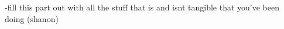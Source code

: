 \color{red}
 -fill this part out with all the stuff that is and isnt tangible that you’ve been doing (shanon)
 \color{black}